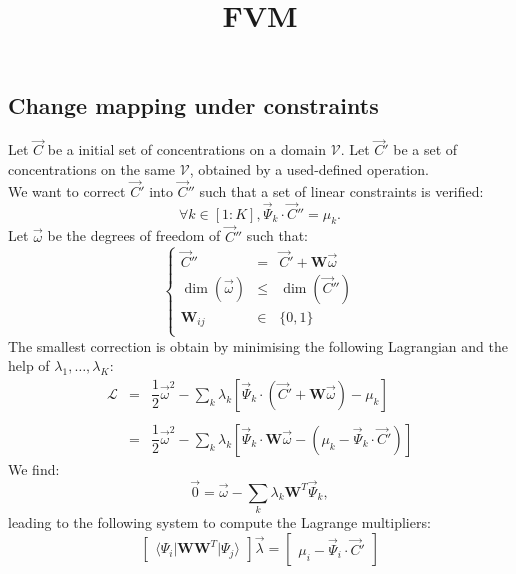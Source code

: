 \documentclass[aps,onecolumn,11pt]{revtex4}
\begin{document}
\title{FVM}
\maketitle

\subsection{Change mapping under constraints}
Let $\vec{C}$ be a initial set of concentrations on a domain $\mathcal{V}$.
Let $\vec{C}'$ be a set of concentrations on the same $\mathcal{V}$, obtained by
a used-defined operation.\\
We want to correct $\vec{C}'$ into $\vec{C}''$ such that a set of linear constraints is verified:
\begin{equation}
	\forall k \in [1:K], \vec{\Psi}_k \cdot \vec{C}'' = \mu_k.
\end{equation}
Let $\vec{\omega}$ be the degrees of freedom of $\vec{C}''$ such that:
\begin{equation}
\left\lbrace
\begin{array}{rcl}
	\vec{C}'' & = &\vec{C}' + \bm{W} \vec{\omega}\\
	 \dim(\vec{\omega}) & \leq & \dim(\vec{C}'')\\
	 \bm{W}_{ij} & \in & \lbrace 0,1\rbrace\\
\end{array}
\right.
\end{equation}
The smallest correction is obtain by minimising the following Lagrangian and
the help of $\lambda_1,\ldots,\lambda_K$:
\begin{equation}
\begin{array}{rcl}
	\mathcal{L} & = &\dfrac{1}{2} \vec{\omega}^2 - 
	\sum_k \lambda_k \left[\vec{\Psi}_k \cdot \left( \vec{C}'+\bm{W} \vec{\omega}\right) - \mu_k\right] \\
	\\
	& = & \dfrac{1}{2} \vec{\omega}^2 - 
	\sum_k \lambda_k \left[\vec{\Psi}_k \cdot \bm{W} \vec{\omega} - \left(\mu_k-\vec{\Psi}_k\cdot\vec{C}'\right)\right] 
\end{array}
\end{equation}
We find:
\begin{equation}
	\vec{0} = \vec{\omega} - \sum_k \lambda_k \bm{W}^T \vec{\Psi}_k,
\end{equation}
leading to the following system to compute the Lagrange multipliers:
\begin{equation}
\begin{bmatrix}
 \langle \Psi_i \vert \bm{W} \bm{W}^T \vert \Psi_j \rangle
\end{bmatrix} \vec{\lambda}
	=  
\begin{bmatrix}
	\mu_i - \vec{\Psi}_i\cdot\vec{C}'
\end{bmatrix}
\end{equation}
\end{document}
